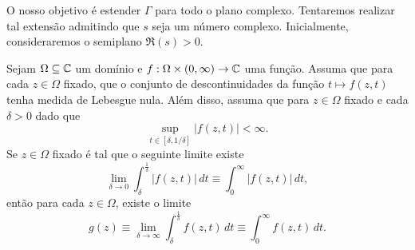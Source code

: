     O nosso objetivo é estender $\Gamma$ para todo o plano complexo. 
    Tentaremos realizar tal extensão admitindo que $s$ seja um número complexo. 
    Inicialmente, consideraremos o semiplano $\Re(s) > 0$.
    
    
    \begin{lema}
    \label{lema-conv-abs-cond-int-imp}
        Sejam $\Omega \subseteq \mathbb{C}$ um domínio e 
        $f: \Omega \times (0,\infty)\to \mathbb{C}$ uma função. 
        Assuma que para cada $z \in \Omega$ fixado, 
        que o conjunto de descontinuidades da função 
        $t \mapsto f(z,t)$ tenha medida de Lebesgue nula. 
        Além disso, assuma que para $z\in \Omega$ fixado e cada $\delta>0$ dado que 
        \[
        \sup_{t \in [\delta,1/\delta]} |f(z,t)| < \infty.
        \]
        Se $z\in \Omega$ fixado é tal que o seguinte limite existe
        \[
        \lim_{\delta \to 0} 
        \int_{\delta}^{ \frac{1}{\delta} }
        |f(z,t)| \, dt
        \equiv 
        \int_{0}^{\infty} |f(z,t)|\, dt ,
        \]
        então para cada $z\in\Omega$, existe o limite 
        \[
        g(z) \equiv \lim_{\delta \to \infty} 
        \int_{\delta}^{ \frac{1}{\delta} }f(z,t) \, dt
        \equiv
        \int_{0}^{\infty }f(z,t) \, dt.
        \]
    \end{lema}
